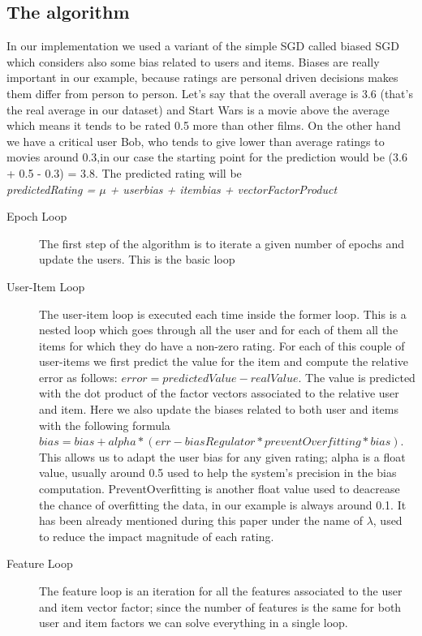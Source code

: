 \documentclass{sig-alternate-05-2015}
\begin{document}
\subsection{The algorithm}
In our implementation we used a variant of the simple SGD called biased SGD
which considers also some bias related to users and items.
Biases are really important in our example, because ratings are personal
driven decisions makes them differ from person to person. Let's say that
the overall average is 3.6 (that's the real average in our dataset) and
Start Wars is a movie above the average which means it tends to be rated
0.5 more than other films. On the other hand we have a critical user Bob,
who tends to give lower than average ratings to movies around 0.3,in our
case the starting point for the prediction would be (3.6 + 0.5 - 0.3) = 3.8.
The predicted rating will be\\
\textit{predictedRating = $\mu$ + userbias + itembias + vectorFactorProduct}

\begin{description}
    \item[Epoch Loop] The first step of the algorithm is to iterate a given number of epochs and update the users. This
    is the basic loop
    \item[User-Item Loop] The user-item loop is executed each time inside the former loop. This is a nested loop
    which goes through all the user and for each of them all the items for which they do have a non-zero rating.
    For each of this couple of user-items we first predict the value for the item and compute the relative error
    as follows: $error = predictedValue - realValue$. The value is predicted with the dot product of the
    factor vectors associated to the relative user and item. Here we also update the biases related
    to both user and items with the following formula $bias = bias + alpha * (err - biasRegulator * preventOverfitting * bias)$.
    This allows us to adapt the user bias for any given rating; alpha is a float value, usually around 0.5
    used to help the system's precision in the bias computation. PreventOverfitting is another float value
    used to deacrease the chance of overfitting the data, in our example is always around 0.1. It has been already mentioned during
    this paper under the name of $\lambda$, used to reduce the impact magnitude of each rating.
    \item[Feature Loop] The feature loop is an iteration for all the features associated to the user and item vector factor;
    since the number of features is the same for both user and item factors we can solve everything in a single loop.


\end{description}
\end{document}
